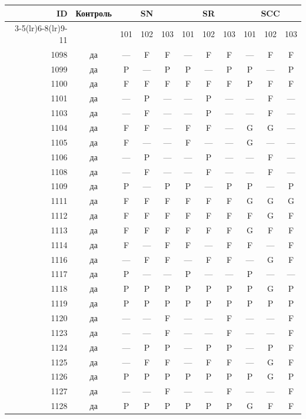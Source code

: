 \begin{table}[p]\centering\small
\begin{tabular*}{\textwidth}{@{\extracolsep{\fill}}rc*{9}{c}@{}}\toprule
ID & Контроль & \multicolumn{3}{c}{SN} & \multicolumn{3}{c}{SR} & \multicolumn{3}{c}{SCC}\\
\cmidrule(lr){3-5}\cmidrule(lr){6-8}\cmidrule(lr){9-11}
 & & 101 & 102 & 103 & 101 & 102 & 103 & 101 & 102 & 103\\\midrule
1098 & да & — & F & F & — & F & F & — & F & F\\
1099 & да & P & — & P & P & — & P & P & — & P\\
1100 & да & F & F & F & F & F & F & P & F & F\\
1101 & да & — & P & — & — & P & — & — & F & —\\
1103 & да & — & F & — & — & P & — & — & F & —\\
1104 & да & F & F & — & F & F & — & G & G & —\\
1105 & да & F & — & — & F & — & — & G & — & —\\
1106 & да & — & P & — & — & P & — & — & F & —\\
1108 & да & — & F & — & — & F & — & — & F & —\\
1109 & да & P & — & P & P & — & P & P & — & P\\
1111 & да & F & F & F & F & F & F & G & G & G\\
1112 & да & F & F & F & F & F & F & F & G & F\\
1113 & да & F & F & F & F & F & F & G & F & F\\
1114 & да & F & — & F & F & — & F & F & — & F\\
1116 & да & — & F & F & — & F & F & — & G & F\\
1117 & да & P & — & — & P & — & — & P & — & —\\
1118 & да & P & P & P & P & P & P & P & G & P\\
1119 & да & P & P & P & P & P & P & P & P & P\\
1120 & да & — & — & F & — & — & F & — & — & F\\
1123 & да & — & — & F & — & — & F & — & — & F\\
1124 & да & — & P & P & — & P & P & — & P & F\\
1125 & да & — & F & F & — & F & F & — & G & F\\
1126 & да & P & P & P & P & P & P & P & G & P\\
1127 & да & — & — & F & — & — & F & — & — & F\\
1128 & да & P & P & P & P & P & P & G & F & F\\

\end{tabular*}
\end{table}
